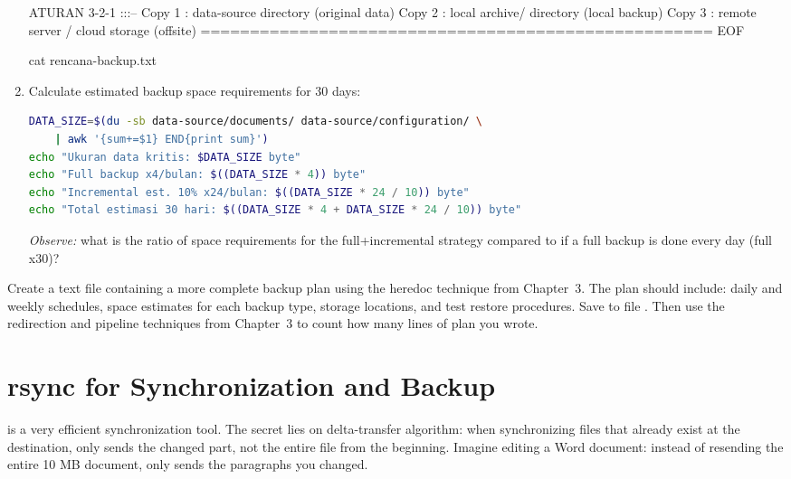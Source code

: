 \begin{enumerate}
\begin{longlisting}[language=bash, caption={Create a backup plan with heredoc}]
ATURAN 3-2-1
:::--
Copy 1 : data-source directory (original data)
Copy 2 : local archive/ directory (local backup)
Copy 3 : remote server / cloud storage (offsite)
====================================================
EOF

cat rencana-backup.txt
\end{longlisting}

\item Calculate estimated backup space requirements for 30 days:
\begin{lstlisting}[language=bash, caption={Estimated backup space requirements}]
DATA_SIZE=$(du -sb data-source/documents/ data-source/configuration/ \
    | awk '{sum+=$1} END{print sum}')
echo "Ukuran data kritis: $DATA_SIZE byte"
echo "Full backup x4/bulan: $((DATA_SIZE * 4)) byte"
echo "Incremental est. 10% x24/bulan: $((DATA_SIZE * 24 / 10)) byte"
echo "Total estimasi 30 hari: $((DATA_SIZE * 4 + DATA_SIZE * 24 / 10)) byte"
\end{lstlisting}
\textit{Observe:} what is the ratio of space requirements for the full+incremental strategy
compared to if a full backup is done every day (full x30)?
\end{enumerate}

\begin{challengebox}
Create a text file containing a more complete backup plan using the heredoc technique from Chapter~3. The plan should include: daily and weekly schedules, space estimates for each backup type, storage locations, and test restore procedures. Save to file . Then use the redirection and pipeline techniques from Chapter~3 to count how many lines of plan you wrote.
\end{challengebox}

\section{rsync for Synchronization and Backup}
\label{sec:rsync-backup}

 is a very efficient synchronization tool. The secret lies
on delta-transfer algorithm: when synchronizing files that already exist at the destination,
\cmd{rsync} only sends the changed part, not the entire file from the beginning.
Imagine editing a Word document: instead of resending the entire 10 MB document,
\cmd{rsync} only sends the paragraphs you changed.

